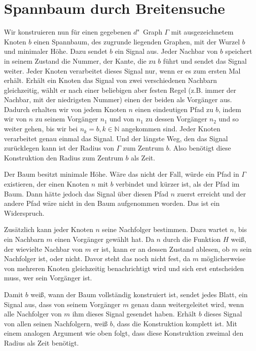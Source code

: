 \documentclass[11pt]{article}
\begin{document}
\section{Spannbaum durch Breitensuche}
Wir konstruieren nun für einen gegebenen $d$"~Graph $\Gamma$ mit ausgezeichnetem Knoten $b$ einen Spannbaum, des zugrunde liegenden Graphen, mit der Wurzel $b$ und minimaler Höhe. 
Dazu sendet $b$ ein Signal aus. Jeder Nachbar von $b$ speichert in seinem Zustand die Nummer, der Kante, die zu $b$ führt und sendet das Signal weiter. 
Jeder Knoten verarbeitet dieses Signal nur, wenn er es zum ersten Mal erhält. 
Erhält ein Knoten das Signal von zwei verschiedenen Nachbarn gleichzeitig, wählt er nach einer beliebigen aber festen Regel (z.B. immer der Nachbar, mit der niedrigsten Nummer) einen der beiden als Vorgänger aus. 
Dadurch erhalten wir von jedem Knoten $n$ einen eindeutigen Pfad zu $b$, indem wir von $n$ zu seinem Vorgänger $n_1$ und von $n_1$ zu dessen Vorgänger $n_2$ und so weiter gehen, bis wir bei $n_k=b, k \in \mathbb{N}$ angekommen sind. 
Jeder Knoten verarbeitet genau einmal das Signal. 
Und der längste Weg, den das Signal zurücklegen kann ist der Radius von $\Gamma$ zum Zentrum $b$. 
Also benötigt diese Konstruktion den Radius zum Zentrum $b$ als Zeit.

Der Baum besitzt minimale Höhe. 
Wäre das nicht der Fall, würde ein Pfad in $\Gamma$ existieren, der einen Knoten $n$ mit $b$ verbindet und kürzer ist, als der Pfad im Baum. 
Dann hätte jedoch das Signal über diesen Pfad $n$ zuerst erreicht und der andere Pfad wäre nicht in den Baum aufgenommen worden. 
Das ist ein Widerspruch.

Zusätzlich kann jeder Knoten $n$ seine Nachfolger bestimmen. 
Dazu wartet $n$, bis ein Nachbarn $m$ einen Vorgänger gewählt hat.
Da $n$ durch die Funktion $H$ weiß, der wievielte Nachbar von $m$ er ist, kann er an dessen Zustand ablesen, ob $m$ sein Nachfolger ist, oder nicht. 
Davor steht das noch nicht fest, da $m$ möglicherweise von mehreren Knoten gleichzeitig benachrichtigt wird und sich erst entscheiden muss, wer sein Vorgänger ist.

Damit $b$ weiß, wann der Baum vollständig konstruiert ist, sendet jedes Blatt, ein Signal aus, dass von seinem Vorgänger $m$ genau dann weitergeleitet wird, wenn alle Nachfolger von $m$ ihm dieses Signal gesendet haben. 
Erhält $b$ dieses Signal von allen seinen Nachfolgern, weiß $b$, dass die Konstruktion komplett ist.
Mit einem analogen Argument wie oben folgt, dass diese Konstruktion zweimal den Radius als Zeit benötigt.
\end{document}
